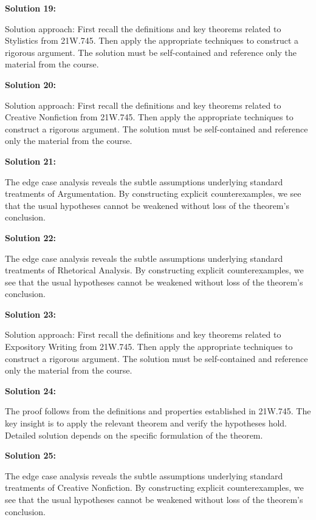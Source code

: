 \documentclass[12pt,a4paper]{exam}
\begin{document}
\vspace{0.5cm}

\textbf{Solution 19:}

Solution approach: First recall the definitions and key theorems related to Stylistics from 21W.745. Then apply the appropriate techniques to construct a rigorous argument. The solution must be self-contained and reference only the material from the course.

\vspace{0.5cm}

\textbf{Solution 20:}

Solution approach: First recall the definitions and key theorems related to Creative Nonfiction from 21W.745. Then apply the appropriate techniques to construct a rigorous argument. The solution must be self-contained and reference only the material from the course.

\vspace{0.5cm}

\textbf{Solution 21:}

The edge case analysis reveals the subtle assumptions underlying standard treatments of Argumentation. By constructing explicit counterexamples, we see that the usual hypotheses cannot be weakened without loss of the theorem's conclusion.

\vspace{0.5cm}

\textbf{Solution 22:}

The edge case analysis reveals the subtle assumptions underlying standard treatments of Rhetorical Analysis. By constructing explicit counterexamples, we see that the usual hypotheses cannot be weakened without loss of the theorem's conclusion.

\vspace{0.5cm}

\textbf{Solution 23:}

Solution approach: First recall the definitions and key theorems related to Expository Writing from 21W.745. Then apply the appropriate techniques to construct a rigorous argument. The solution must be self-contained and reference only the material from the course.

\vspace{0.5cm}

\textbf{Solution 24:}

The proof follows from the definitions and properties established in 21W.745. The key insight is to apply the relevant theorem and verify the hypotheses hold. Detailed solution depends on the specific formulation of the theorem.

\vspace{0.5cm}

\textbf{Solution 25:}

The edge case analysis reveals the subtle assumptions underlying standard treatments of Creative Nonfiction. By constructing explicit counterexamples, we see that the usual hypotheses cannot be weakened without loss of the theorem's conclusion.

\vspace{0.5cm}
\end{document}
